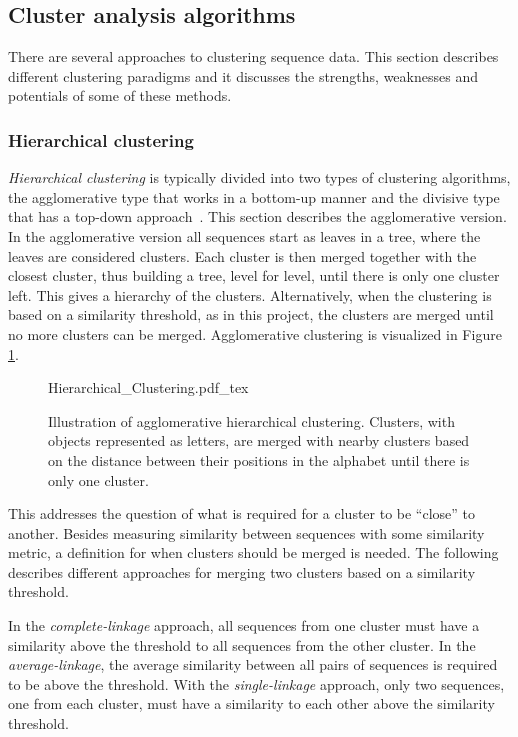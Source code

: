 \subsection{Cluster analysis algorithms}

There are several approaches to clustering sequence data. This section
describes different clustering paradigms and it discusses the strengths,
weaknesses and potentials of some of these methods.

\subsubsection{Hierarchical clustering}

\emph{Hierarchical clustering} is typically divided into two types of
clustering algorithms, the agglomerative type that works in a bottom-up manner
and the divisive type that has a top-down approach~\cite{dong}. This section
describes the agglomerative version. In the agglomerative version all sequences
start as leaves in a tree, where the leaves are considered clusters. Each
cluster is then merged together with the closest cluster, thus building a tree,
level for level, until there is only one cluster left. This gives a hierarchy
of the clusters. Alternatively, when the clustering is based on a similarity
threshold, as in this project, the clusters are merged until no more clusters
can be merged. Agglomerative clustering is visualized in Figure
\ref{fig:hierarchical_clustering}.

\begin{figure}[h!]
  \centering
  \def\svgwidth{\columnwidth}
  {Hierarchical_Clustering.pdf_tex}
  \caption{Illustration of agglomerative hierarchical clustering. Clusters,
  with objects represented as letters, are merged with nearby clusters based
  on the distance between their positions in the alphabet until there is only
  one cluster.}
  \label{fig:hierarchical_clustering}
\end{figure}

This addresses the question of what is required for a cluster to be ``close''
to another. Besides measuring similarity between sequences with some similarity
metric, a definition for when clusters should be merged is needed. The
following describes different approaches for merging two clusters based on a
similarity threshold.

In the \textit{complete-linkage} approach, all sequences from one cluster must
have a similarity above the threshold to all sequences from the other cluster.
In the \textit{average-linkage}, the average similarity between all pairs of
sequences is required to be above the threshold. With the
\textit{single-linkage} approach, only two sequences, one from each cluster,
must have a similarity to each other above the similarity threshold.

